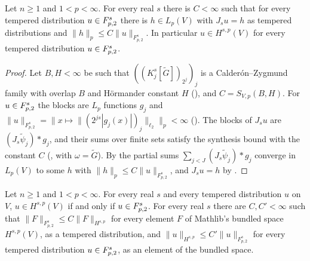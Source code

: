 \begin{theorem}
\label{thm:triebel-lizorkin-distr-to-bessel}
\leanok
{}
Let $n \geq 1$ and $1 < p < \infty$. For every real $s$ there is $C < \infty$ such that for every
tempered distribution $u \in F^{s}_{p,2}$ there is $h \in L_p(V)$ with $J_s u = h$ as tempered
distributions and $\|h\|_p \leq C \|u\|_{F^s_{p,2}}$. In particular $u \in H^{s,p}(V)$ for every
tempered distribution $u \in F^{s}_{p,2}$.
\end{theorem}

\begin{proof}
\leanok
Let $B, H < \infty$ be such that $((K^s_j[\tilde G])_{2^j})_j$ is a Calder\'on--Zygmund family
with overlap $B$ and H\"ormander constant $H$ (), and
$C = S_{V,p}(B, H)$. For $u \in F^{s}_{p,2}$ the blocks are $L_p$ functions $g_j$ and
$\|u\|_{F^s_{p,2}} = \| x \mapsto \| (2^{js} |g_j(x)|)_j \|_{\ell_2} \|_p < \infty$
(). The blocks of $J_s u$ are $(J_s \tilde\psi_j) * g_j$, and their sums
over finite sets satisfy the synthesis bound with the constant $C$
(,  with
$\omega = \tilde G$). By  the partial sums
$\sum_{j < J} (J_s \tilde\psi_j) * g_j$ converge in $L_p(V)$ to some $h$ with
$\|h\|_p \leq C \|u\|_{F^s_{p,2}}$, and $J_s u = h$ by .
\end{proof}

\begin{theorem}[$H^{s,p} = \TL{s}{p}{2}$ for every real $s$]
\label{thm:bessel-triebel-lizorkin-distr}
\leanok
{}
Let $n \geq 1$ and $1 < p < \infty$. For every real $s$ and every tempered distribution $u$ on
$V$, $u \in H^{s,p}(V)$ if and only if $u \in F^{s}_{p,2}$. For every real $s$ there are
$C, C' < \infty$ such that $\|F\|_{F^s_{p,2}} \leq C \|F\|_{H^{s,p}}$ for every element $F$ of
Mathlib's bundled space $H^{s,p}(V)$, as a tempered distribution, and
$\|u\|_{H^{s,p}} \leq C' \|u\|_{F^s_{p,2}}$ for every tempered distribution
$u \in F^{s}_{p,2}$, as an element of the bundled space.
\end{theorem}

